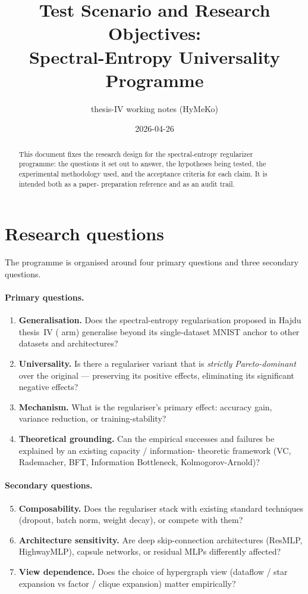 \documentclass[11pt,a4paper]{article}
\title{Test Scenario and Research Objectives:\\
       Spectral-Entropy Universality Programme}
\author{thesis-IV working notes (HyMeKo)}
\date{2026-04-26}
\newcommand{\code}[1]{\texttt{\detokenize{#1}}}
\begin{document}
\maketitle

\begin{abstract}
This document fixes the research design for the spectral-entropy
regularizer programme: the questions it set out to answer, the
hypotheses being tested, the experimental methodology used, and the
acceptance criteria for each claim. It is intended both as a paper-
preparation reference and as an audit trail.
\end{abstract}

\section{Research questions}

The programme is organised around four primary questions and three
secondary questions.

\paragraph{Primary questions.}
\begin{enumerate}
  \item \textbf{Generalisation.} Does the spectral-entropy regularisation
        proposed in Hajdu thesis~IV (\code{scalar_entropy} arm) generalise
        beyond its single-dataset MNIST anchor to other datasets and
        architectures?
  \item \textbf{Universality.} Is there a regulariser variant that is
        \emph{strictly Pareto-dominant} over the original ---
        preserving its positive effects, eliminating its significant
        negative effects?
  \item \textbf{Mechanism.} What is the regulariser's primary effect:
        accuracy gain, variance reduction, or training-stability?
  \item \textbf{Theoretical grounding.} Can the empirical successes
        and failures be explained by an existing capacity / information-
        theoretic framework (VC, Rademacher, BFT, Information
        Bottleneck, Kolmogorov-Arnold)?
\end{enumerate}

\paragraph{Secondary questions.}
\begin{enumerate}\setcounter{enumi}{4}
  \item \textbf{Composability.} Does the regulariser stack with
        existing standard techniques (dropout, batch norm,
        weight decay), or compete with them?
  \item \textbf{Architecture sensitivity.} Are deep skip-connection
        architectures (ResMLP, HighwayMLP), capsule networks, or
        residual MLPs differently affected?
  \item \textbf{View dependence.} Does the choice of hypergraph
        view (dataflow / star expansion vs factor / clique
        expansion) matter empirically?
\end{enumerate}
\end{document}
